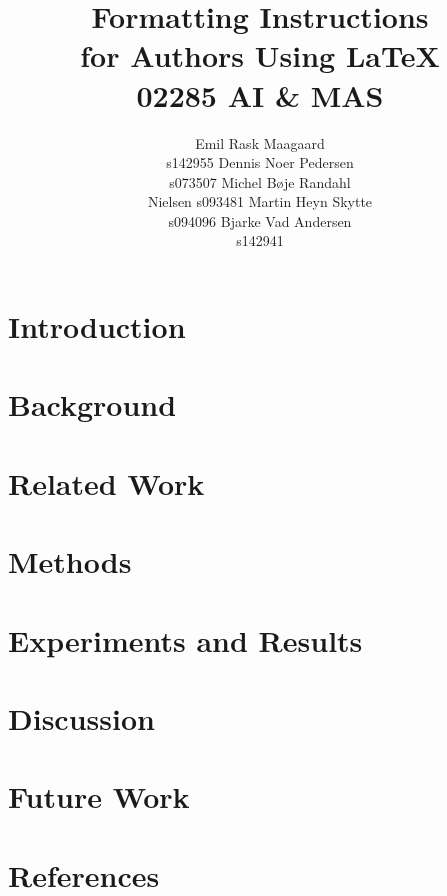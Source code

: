 \documentclass[letterpaper]{article}
\begin{document}
\title{Formatting Instructions \\for Authors Using \LaTeX{} \\ 02285 AI \& MAS}
\author{Emil Rask Maagaard \\ s142955 \And Dennis Noer Pedersen \\ s073507 \And
  Michel B\o je Randahl \\ Nielsen s093481 \AND Martin Heyn Skytte \\ s094096 \And
  Bjarke Vad Andersen \\ s142941}
\maketitle
\begin{abstract}

\end{abstract}

\section{Introduction}


\section{Background}


\section{Related Work}


\section{Methods}


\section{Experiments and Results}


\section{Discussion}


\section{Future Work}


\section{References}



\end{document}
